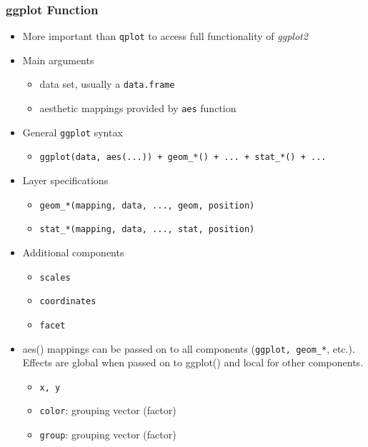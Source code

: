\documentclass{beamer}
\newcommand{\Rfunction}[1]{{\texttt{#1}}}
\newcommand{\Rpackage}[1]{{\textit{#1}}}
\begin{document}
\begin{frame}[containsverbatim]  
	\frametitle{ggplot Function}
\scriptsize
\begin{itemize}
	\item More important than \Rfunction{qplot} to access full functionality of \Rpackage {ggplot2} 
	\item Main arguments
        \begin{itemize}
	\scriptsize
        	\item data set, usually a \Rfunction{data.frame}
		\item aesthetic mappings provided by \Rfunction{aes} function
	\end{itemize}
	\item General \Rfunction{ggplot} syntax
        \begin{itemize}
	\scriptsize
        	\item \Rfunction{ggplot(data, aes(...)) + geom\_*() + ... + stat\_*() + ...}
	\end{itemize}
	\item Layer specifications
        \begin{itemize}
	\scriptsize
        	\item \Rfunction{geom\_*(mapping, data, ..., geom, position)}
		\item \Rfunction{stat\_*(mapping, data, ..., stat, position)}
	\end{itemize}
	\item Additional components
        \begin{itemize}
	\scriptsize
        	\item \Rfunction{scales}
		\item \Rfunction{coordinates} 
		\item \Rfunction{facet}
	\end{itemize}
	\item aes() mappings can be passed on to all components (\Rfunction{ggplot, geom\_*}, etc.). Effects are global when passed on to ggplot() and local for other components.
        \begin{itemize}
	\scriptsize
        	\item \Rfunction{x, y}
		\item \Rfunction{color}: grouping vector (factor) 
		\item \Rfunction{group}: grouping vector (factor)
	\end{itemize}
\end{itemize}
\end{frame}
\end{document}

